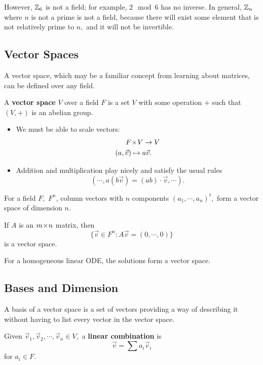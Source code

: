 However, $\mathbb Z_6$ is not a field; for example, $2 \mod 6$ has no inverse. In general, $\mathbb Z_n$ where $n$ is not a prime is not a field, because there will exist some element that is not relatively prime to $n,$ and it will not be invertible. %

\subsection{Vector Spaces}

A vector space, which may be a familiar concept from learning about matrices, can be defined over any field. 
\begin{definition}
A \textbf{vector space} $V$ over a field $F$ is a set $V$ with some operation + such that $(V, +)$ is an abelian group. 
\begin{itemize}
    \item We must be able to scale vectors:
    \begin{align*}
    F &\hspace{0.05em}{\times}\hspace{0.05em} V \rightarrow V \\
    (a, \vec{v}) &\mapsto a\vec{v}.
    \end{align*}
    \item Addition and multiplication play nicely and satisfy the usual rules 
    \[
    (\cdots, a(b\vec{v}) = (ab) \cdot \vec{v}, \cdots ).
    \]
    
\end{itemize}
\end{definition}

\begin{example}
For a field $F,$ $F^n$, column vectors with $n$ components $(a_1, \cdots, a_n)^t,$ form a vector space of dimension $n.$
\end{example}

\begin{example}
If $A$ is an $m \hspace{0.05em}{\times}\hspace{0.05em} n$ matrix, then 
\[
\{\vec{v} \in F^n : A\vec{v} = (0, \cdots, 0)\}
\]
is a vector space.
\end{example}

\begin{example}
For a homogeneous linear ODE, the solutions form a vector space.
\end{example}

\subsection{Bases and Dimension}

A basis of a vector space is a set of vectors providing a way of describing it without having to list every vector in the vector space.
\begin{definition}
Given $\vec{v}_1, \vec{v}_2, \cdots, \vec{v}_n \in V,$ a \textbf{linear combination} is 
\[
\vec{v} = \sum a_i\vec{v}_i
\]
for $a_i \in F.$
\end{definition}

